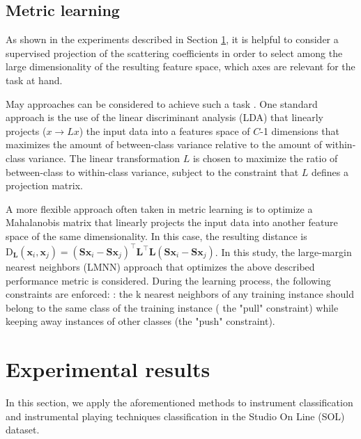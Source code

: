 \documentclass{article}
\begin{document}
\subsection{Metric learning} %

As shown in the experiments described in Section \ref{sec:exp}, it is helpful to consider a supervised projection of the scattering coefficients in order to select among the large dimensionality of the resulting feature space, which axes are relevant for the task at hand.

May approaches can be considered to achieve such a task \cite{bellet2013survey}. One standard approach is the use of the linear discriminant analysis (LDA) that linearly projects ($x \rightarrow L x$) the input data into a features space of $C$-1 dimensions that maximizes the amount of between-class variance
relative to the amount of within-class variance. The linear transformation $L$ is chosen to maximize the ratio of between-class to within-class variance,
subject to the constraint that $L$ defines a projection matrix.


A more flexible approach often taken in metric learning is to optimize a Mahalanobis matrix that linearly projects the input data into another feature space of the same dimensionality. In this case, the resulting distance is $\mathrm{D}_\mathbf{L}(\boldsymbol{x}_i, \boldsymbol{x}_j) = (\mathbf{S}\boldsymbol{x}_i - \mathbf{S}\boldsymbol{x}_j)^{\top}  \mathbf{L}^{\top} \mathbf{L} (\mathbf{S}\boldsymbol{x}_i-\mathbf{S}\boldsymbol{x}_j)$.
In this study, the large-margin nearest neighbors (LMNN) approach \cite{weinberger2006nips, weinberger2009jmlr} that optimizes the above described performance metric is considered. During the learning process, the following constraints are enforced: : the
k nearest neighbors of any training instance should belong to the
same class of the training instance ( the "pull" constraint) while keeping away instances of other classes (the "push" constraint).



\section{Experimental results} \label{sec:exp}
In this section, we apply the aforementioned methods to instrument classification and instrumental playing techniques classification in the Studio On Line (SOL) dataset.
\end{document}
